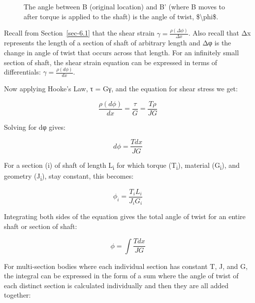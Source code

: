 \documentclass[
  letterpaper,
  DIV=11,
  numbers=noendperiod]{scrreprt}
\theoremstyle{definition}
\theoremstyle{remark}
\begin{document}
\begin{figure}


\caption{\label{fig-6.12}The angle between B (original location) and B'
(where B moves to after torque is applied to the shaft) is the angle of
twist, \$\textbackslash phi\$.}

\end{figure}%

Recall from Section~\ref{sec-6.1} that the shear strain
\(\gamma=\frac{\rho(\Delta \phi)}{\Delta x}\). Also recall that Δx
represents the length of a section of shaft of arbitrary length and Δφ
is the change in angle of twist that occurs across that length. For an
infinitely small section of shaft, the shear strain equation can be
expressed in terms of differentials:
\(\gamma=\frac{\rho(d \phi)}{d x}\).

Now applying Hooke's Law, τ = Gγ, and the equation for shear stress we
get:

\[
\frac{\rho(d \phi)}{d x}=\frac{\tau}{G}=\frac{T \rho}{J G}
\]

Solving for dφ gives:

\[
d \phi=\frac{T d x}{J G}
\]

For a section (i) of shaft of length L\textsubscript{i} for which torque
(T\textsubscript{i}), material (G\textsubscript{i}), and geometry
(J\textsubscript{i}), stay constant, this becomes:

\[
\phi_i=\frac{T_i L_i}{J_i G_i}
\]

Integrating both sides of the equation gives the total angle of twist
for an entire shaft or section of shaft:

\[
\phi=\int \frac{T d x}{J G}
\]

For multi-section bodies where each individual section has constant T,
J, and G, the integral can be expressed in the form of a sum where the
angle of twist of each distinct section is calculated individually and
then they are all added together:
\end{document}

